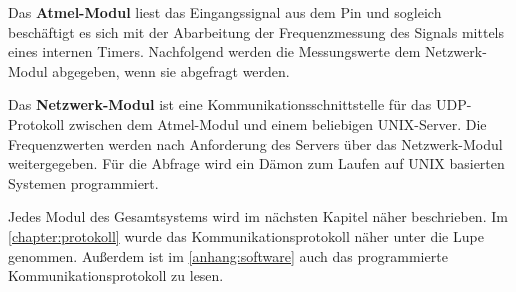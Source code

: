 Das \textbf{Atmel-Modul} liest das Eingangssignal aus dem Pin und sogleich beschäftigt es sich mit der Abarbeitung der Frequenzmessung des Signals mittels eines internen Timers. Nachfolgend werden die Messungswerte dem Netzwerk-Modul abgegeben, wenn sie abgefragt werden. \smallskip \smallskip

Das \textbf{Netzwerk-Modul} ist eine Kommunikationsschnittstelle für das UDP-Protokoll zwischen dem Atmel-Modul und einem beliebigen UNIX-Server. Die Frequenzwerten werden nach Anforderung des Servers über das Netzwerk-Modul weitergegeben. Für die Abfrage wird ein Dämon zum Laufen auf UNIX basierten Systemen programmiert. \smallskip \smallskip

Jedes Modul des Gesamtsystems wird im nächsten Kapitel näher beschrieben. Im \autoref{chapter:protokoll} wurde das Kommunikationsprotokoll näher unter die Lupe genommen. Außerdem ist im \autoref{anhang:software} auch das programmierte Kommunikationsprotokoll zu lesen.

